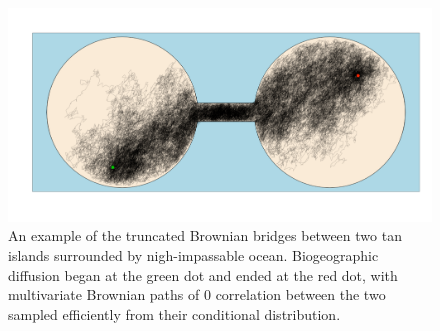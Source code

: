 \documentclass[10pt]{article}
\begin{document}
\begin{figure}[h]
\centering
\includegraphics[width=160mm]{figures/biogeographic_diffusion.png}
\caption[Truncated Multivariate Brownian Motion in the Context of Biogeographic Diffusion]{An example of the truncated Brownian bridges between two tan islands surrounded by nigh-impassable ocean. Biogeographic diffusion began at the green dot and ended at the red dot, with multivariate Brownian paths of 0 correlation between the two sampled efficiently from their conditional distribution. \label{overflow} \label{fig:truncBrownMot}}
\end{figure}
\end{document}
